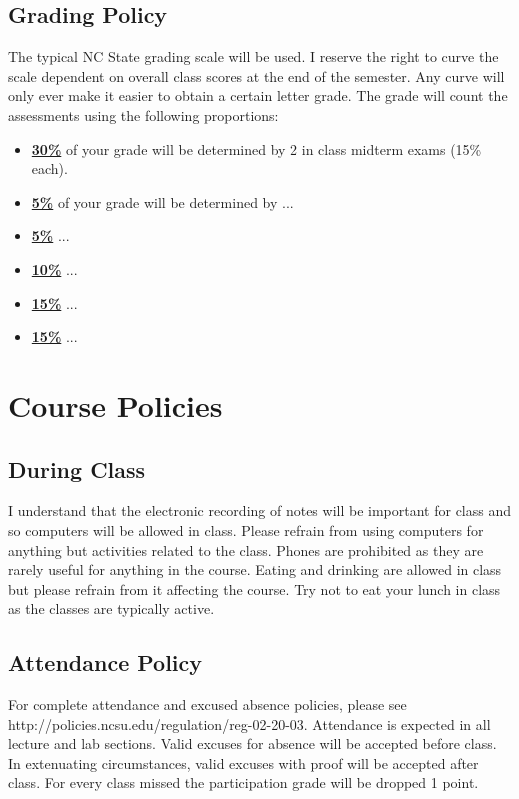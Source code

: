 \subsection*{Grading Policy}
The typical NC State grading scale will be used. I reserve the right to curve the scale dependent on overall class scores at the end of the semester. Any curve will only ever make it easier to obtain a certain letter grade. The grade will count the assessments using the following proportions:
\begin{itemize}
	\item \underline{\textbf{30\%}} of your grade will be determined by 2 in class midterm exams (15\% each).
	\item \underline{\textbf{5\%}} of your grade will be determined by ...
	\item \underline{\textbf{5\%}} ...
    \item \underline{\textbf{10\%}}  ...
	\item \underline{\textbf{15\%}} ...
	\item \underline{\textbf{15\%}} ...
\end{itemize}




\newpage
\section*{Course Policies}

\subsection*{During Class}
\footnotesize{I understand that the electronic recording of notes will be important for class and so computers will be allowed in class. Please refrain from using computers for anything but activities related to the class. Phones are prohibited as they are rarely useful for anything in the course. Eating and drinking are allowed in class but please refrain from it affecting the course. Try not to eat your lunch in class as the classes are typically active.}

\subsection*{Attendance Policy}
\footnotesize{For complete attendance and excused absence policies, please see http://policies.ncsu.edu/regulation/reg-02-20-03. Attendance is expected in all lecture and lab sections. Valid excuses for absence will be accepted before class. In extenuating circumstances, valid excuses with proof will be accepted after class. For every class missed the participation grade will be dropped 1 point.}

